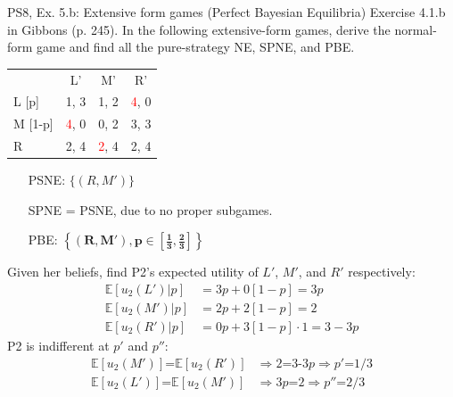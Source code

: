 \begin{frame}{PS8, Ex. 5.b: Extensive form games (Perfect Bayesian Equilibria)}
    Exercise 4.1.b in Gibbons (p. 245). In the following extensive-form games, derive the normal-form game and find all the pure-strategy NE, SPNE, and PBE.
    \vspace{-9pt}
    \begin{multicols}{2}
      \begin{table}
        \begin{tabular}{l|c|c|c|}
          \multicolumn{1}{c}{} & \multicolumn{1}{c}{L'} & \multicolumn{1}{c}{M'} & \multicolumn{1}{c}{R'} \\\cline{2-4}
          L [p]   & 1, \color{blue}3 & 1, 2 & \textcolor{red}{4}, 0 \\\cline{2-4}
          M [1-p] & \textcolor{red}{4}, 0 & 0, 2 & 3, \color{blue}3 \\\cline{2-4}
          R       & 2, \color{blue}4 & \textcolor{red}{2}, \color{blue}4 & 2, \color{blue}4 \\\cline{2-4}
        \end{tabular}
      \end{table} \vspace{-8pt}
      \begin{itemize}
        \item[PSNE:] $\{(R,M')\}$
        \item[SPNE =] PSNE, due to no proper subgames.
        \item[PBE:] $\bm{\left\{(R,M'),p\in\left[\frac{1}{3},\frac{2}{3}\right]\right\}}$
      \end{itemize} \vspace{-6pt}
      Given her beliefs, find P2's expected utility of $L'$, $M'$, and $R'$ respectively: \vspace{-6pt}
      \begin{align*}
        \mathbb{E}[u_2(L')|p]&=3p+0[1-p]=3p\\ \mathbb{E}[u_2(M')|p]&=2p+2[1-p]=2\\
        \mathbb{E}[u_2(R')|p]&=0p+3[1-p]\cdot1=3-3p
      \end{align*}
      P2 is indifferent at $p'$ and $p''$: \vspace{-6pt}
      \begin{align*}
        \mathbb{E}[u_2(M')]\text{=}\mathbb{E}[u_2(R')]&\Rightarrow 2\text{=3-3}p\Rightarrow p'\text{=}1/3\\
        \mathbb{E}[u_2(L')]\text{=}\mathbb{E}[u_2(M')]&\Rightarrow 3p\text{=}2\Rightarrow p''\text{=}2/3

\end{align*}
\end{multicols}
\end{frame}

